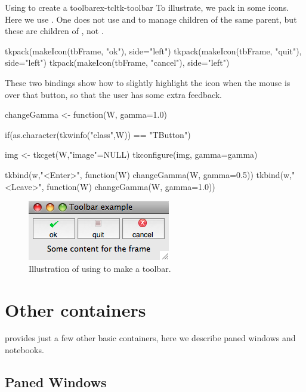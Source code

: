 \begin{example}{Using  to create a toolbar}{ex-tcltk-toolbar}
To illustrate, we pack in some icons. Here we use .  
One does not use  and  to manage
children of the same parent, but these are children of ,
not .
\begin{Schunk}
\begin{Sinput}
 tkpack(makeIcon(tbFrame, "ok"), side="left")
 tkpack(makeIcon(tbFrame, "quit"), side="left")
 tkpack(makeIcon(tbFrame, "cancel"), side="left")
\end{Sinput}
\end{Schunk}

These two bindings show how to slightly highlight the icon when the
mouse is over that button, so that the user has some extra feedback.
\begin{Schunk}
\begin{Sinput}
 changeGamma <- function(W, gamma=1.0) {
   if(as.character(tkwinfo("class",W)) == "TButton") {
     img <- tkcget(W,"image"=NULL)
     tkconfigure(img, gamma=gamma)
   
   }
 }
 tkbind(w,"<Enter>", function(W) changeGamma(W, gamma=0.5))
 tkbind(w,"<Leave>", function(W) changeGamma(W, gamma=1.0))
\end{Sinput}
\end{Schunk}

\begin{figure}
  \centering
  \includegraphics[width=.4\textwidth]{fig-tcltk-toolbar.png}
  \caption{Illustration of using  to make a toolbar. }
  \label{fig:fig-tcltk-toolbar}
\end{figure}

\end{example}


\section{Other containers}
\label{sec:tcltk:other-containers}
\TK\/ provides just a few other basic containers, here we describe paned windows and notebooks.

\subsection{Paned Windows}
\label{sec:tcltk:paned-windows}


